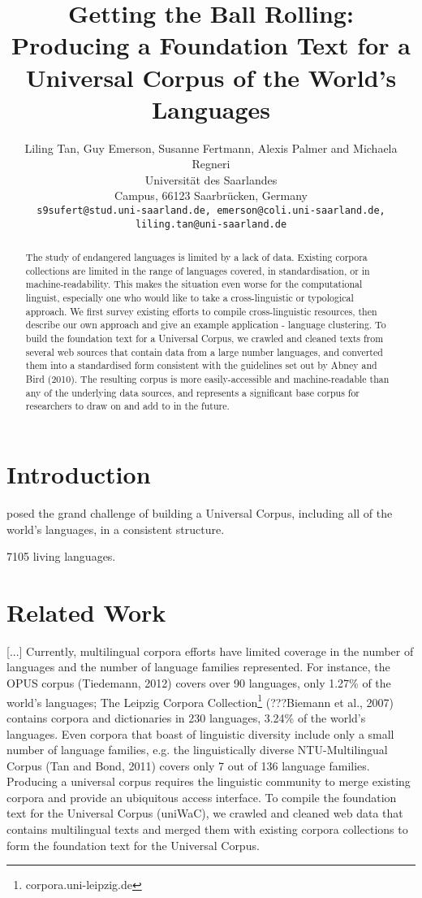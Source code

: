 \documentclass[11pt]{article}
\title{Getting the Ball Rolling: Producing a Foundation Text for a Universal Corpus of the World's Languages}
\author{Liling Tan, Guy Emerson, Susanne Fertmann, Alexis Palmer and Michaela Regneri \\
  Universität des Saarlandes \\
  Campus, 66123 Saarbrücken, Germany \\
  {\tt s9sufert@stud.uni-saarland.de, emerson@coli.uni-saarland.de,} \\
  {\tt liling.tan@uni-saarland.de}}
\date{}
\begin{document}
\maketitle
\begin{abstract}
The study of endangered languages is limited by a lack of data. Existing corpora collections are limited in the range of languages covered, in standardisation, or in machine-readability. This makes the situation even worse for the computational linguist, especially one who would like to take a cross-linguistic or typological approach. We first survey existing efforts to compile cross-linguistic resources, then describe our own approach and give an example application - language clustering. To build the foundation text for a Universal Corpus, we crawled and cleaned texts from several web sources that contain data from a large number languages, and converted them into a standardised form consistent with the guidelines set out by Abney and Bird (2010). The resulting corpus is more easily-accessible and machine-readable than any of the underlying data sources, and represents a significant base corpus for researchers to draw on and add to in the future.
\end{abstract}

\section{Introduction}

 posed the grand challenge of building a Universal Corpus, including all of the world's languages, in a consistent structure.

7105 living languages.


\section{Related Work}

[...]
Currently, multilingual corpora efforts have limited coverage in the number of languages and the number of language families represented. For instance, the OPUS corpus (Tiedemann, 2012) covers over 90 languages, only 1.27\% of the world's languages; The Leipzig Corpora Collection\footnote{corpora.uni-leipzig.de} (???Biemann et al., 2007) contains corpora and dictionaries in 230 languages, 3.24\% of the world's languages. Even corpora that boast of linguistic diversity include only a small number of language families, e.g. the linguistically diverse NTU-Multilingual Corpus (Tan and Bond, 2011) covers only 7 out of 136 language families. Producing a universal corpus requires the linguistic community to merge existing corpora and provide an ubiquitous access interface. To compile the foundation text for the Universal Corpus (uniWaC), we crawled and cleaned web data that contains multilingual texts and merged them with existing corpora collections to form the foundation text for the Universal Corpus.
\end{document}
